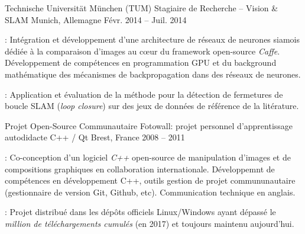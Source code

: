 \begin{cventries}
  \cventry
  {Technische Universität München (TUM)} %
  {Stagiaire de Recherche -- Vision \& SLAM} %
  {Munich, Allemagne} %
  {Févr. 2014 -- Juil. 2014} %
  {
    \begin{cvitems} %
    \item {} : Intégration et développement d'une architecture de réseaux
      de neurones siamois dédiée à la comparaison d'images au cœur du framework open-source \emph{Caffe}.
      Développement de compétences en programmation GPU et du background mathématique des mécanismes de
      backpropagation dans des réseaux de neurones.
    \item {} : Application et évaluation de la méthode pour la
      détection de fermetures de boucle SLAM (\emph{loop closure}) sur des jeux de données de référence de la
      litérature.
    \end{cvitems}
  }

  \cventry
  {Projet Open-Source Communautaire} %
  {Fotowall: projet personnel d'apprentissage autodidacte C++ / Qt} %
  {Brest, France} %
  {2008 -- 2011} %
  {
    \begin{cvitems} %
    \item {} : Co-conception d'un logiciel \emph{C++} open-source de
      manipulation d'images et de compositions graphiques en collaboration internationale. Développemnt de
      compétences en développement C++, outils gestion de projet commununautaire (gestionnaire de version
      Git, Github, etc). Communication technique en anglais.
    \item {} : Projet distribué dans les dépôts officiels Linux/Windows
      ayant dépassé le \emph{million de téléchargements cumulés} (en 2017) et toujours maintenu aujourd'hui.
    \end{cvitems}
  }
\end{cventries}


